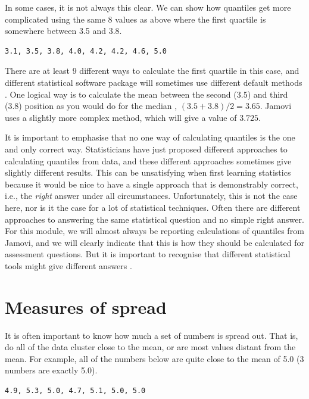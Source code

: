 \documentclass[
]{scrbook}
\begin{document}
In some cases, it is not always this clear.
We can show how quantiles get more complicated using the same 8 values as above where the first quartile is somewhere between 3.5 and 3.8.

\begin{verbatim}
3.1, 3.5, 3.8, 4.0, 4.2, 4.2, 4.6, 5.0
\end{verbatim}

There are at least 9 different ways to calculate the first quartile in this case, and different statistical software package will sometimes use different default methods \citep{Hyndman1996}.
One logical way is to calculate the mean between the second (3.5) and third (3.8) position as you would do for the median \citep{Rowntree2018}, \((3.5 + 3.8) / 2 = 3.65\).
Jamovi uses a slightly more complex method, which will give a value of \(3.725\).

It is important to emphasise that no one way of calculating quantiles is the one and only correct way.
Statisticians have just proposed different approaches to calculating quantiles from data, and these different approaches sometimes give slightly different results.
This can be unsatisfying when first learning statistics because it would be nice to have a single approach that is demonstrably correct, i.e., the \emph{right} answer under all circumstances.
Unfortunately, this is not the case here, nor is it the case for a lot of statistical techniques.
Often there are different approaches to answering the same statistical question and no simple right answer.
For this module, we will almost always be reporting calculations of quantiles from Jamovi, and we will clearly indicate that this is how they should be calculated for assessment questions.
But it is important to recognise that different statistical tools might give different answers \citep{Hyndman1996}.

\hypertarget{Chapter_12}{%
\chapter{Measures of spread}\label{Chapter_12}}

It is often important to know how much a set of numbers is spread out.
That is, do all of the data cluster close to the mean, or are most values distant from the mean.
For example, all of the numbers below are quite close to the mean of 5.0 (3 numbers are exactly 5.0).

\begin{verbatim}
4.9, 5.3, 5.0, 4.7, 5.1, 5.0, 5.0
\end{verbatim}
\end{document}

